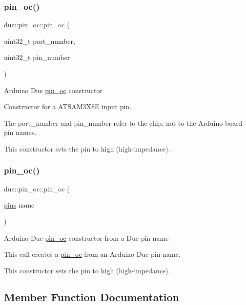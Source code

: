 \subsubsection{\texorpdfstring{pin\+\_\+oc()}{pin\_oc()}\hspace{0.1cm}{\footnotesize\ttfamily [1/2]}}
{\footnotesize\ttfamily due\+::pin\+\_\+oc\+::pin\+\_\+oc (\begin{DoxyParamCaption}\item[{uint32\+\_\+t}]{port\+\_\+number,  }\item[{uint32\+\_\+t}]{pin\+\_\+number }\end{DoxyParamCaption})\hspace{0.3cm}{\ttfamily [inline]}}

Arduino Due \hyperlink{classdue_1_1pin__oc}{pin\+\_\+oc} constructor

Constructor for a A\+T\+S\+A\+M3\+X8E input pin.

The port\+\_\+number and pin\+\_\+number refer to the chip, not to the Arduino board pin names.

This constructor sets the pin to high (high-\/impedance). \mbox{\label{classdue_1_1pin__oc_a26daecda4236219f16e896cb82e9e6aa}} 
\subsubsection{\texorpdfstring{pin\+\_\+oc()}{pin\_oc()}\hspace{0.1cm}{\footnotesize\ttfamily [2/2]}}
{\footnotesize\ttfamily due\+::pin\+\_\+oc\+::pin\+\_\+oc (\begin{DoxyParamCaption}\item[{\hyperlink{namespacedue_a8ffa3ec309934ff9db34317e504bcc92}{pins}}]{name }\end{DoxyParamCaption})\hspace{0.3cm}{\ttfamily [inline]}}

Arduino Due \hyperlink{classdue_1_1pin__oc}{pin\+\_\+oc} constructor from a Due pin name

This call creates a \hyperlink{classdue_1_1pin__oc}{pin\+\_\+oc} from an Arduino Due pin name.

This constructor sets the pin to high (high-\/impedance). 

\subsection{Member Function Documentation}
\mbox{\label{classdue_1_1pin__oc_a911e67dbcc0005b3eae0d511f576a215}} 
